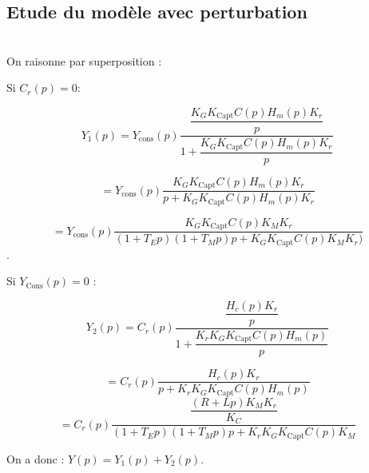\ifprof
\begin{corrige}
\end{corrige}
\else
\fi

\ifprof
\begin{corrige}
\end{corrige}
\else
\fi



\subsection*{Etude du modèle avec perturbation}

\ifprof
\begin{corrige}~\\
On raisonne par superposition :

Si $C_r (p)=0$: 

$$Y_1 (p)
=Y_{\text{cons}}(p) \dfrac{\dfrac{K_G K_{\text{Capt}} C(p) H_m (p) K_r}{p}}{1+\dfrac{K_G K_{\text{Capt}} C(p) H_m (p) K_r}{p}}$$

$$
=Y_{\text{cons}} (p) \dfrac{K_G K_{\text{Capt}} C(p) H_m (p) K_r}{p+K_G K_{\text{Capt}} C(p) H_m (p) K_r } 
$$

$$
=Y_{\text{cons}} (p) \dfrac{K_G K_{\text{Capt}} C(p) K_M  K_r}{(1+T_E p)(1+T_M p)p+K_G K_{\text{Capt}} C(p) K_M K_r )}$$.

\end{corrige}

\begin{corrige}
Si $Y_{\text{Cons}} (p)=0$ :

$$Y_2 (p)
=C_r (p) \dfrac{\dfrac{H_c (p) K_r}{p}}{1+\dfrac{K_r K_G K_{\text{Capt}} C(p) H_m (p)}{p} }$$

$$
=C_r (p) \dfrac{H_c (p) K_r}{p+K_r K_G K_{\text{Capt}} C(p) H_m (p) }$$
$$
=C_r (p) \dfrac{\dfrac{(R+Lp) K_M  K_r}{K_C }}{(1+T_E p)(1+T_M p)p+K_r K_G K_{\text{Capt}} C(p) K_M }$$

On a donc :
$Y(p)=Y_1 (p)+Y_2 (p)$.

\end{corrige}
\else
\fi

\ifprof
\begin{corrige}
\end{corrige}
\else
\fi


